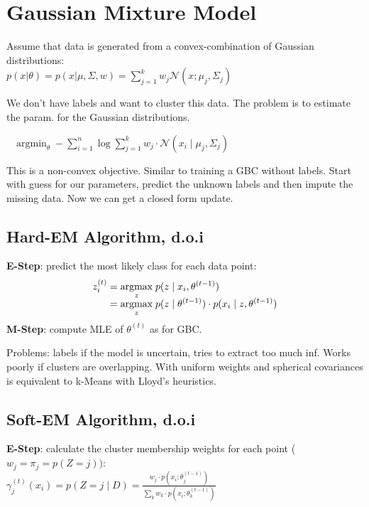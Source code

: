 \section*{Gaussian Mixture Model}

Assume that data is generated from a convex-combination of Gaussian distributions: \\[-8pt]

$p(x  | \theta) = p(x  | \mu, \Sigma, w) = \sum_{j=1}^k w_j \mathcal{N}(x; \mu_j, \Sigma_j)$

We don't have labels and want to cluster this data. The problem is to estimate the param. for the Gaussian distributions.

\ \ $\text{argmin}_{\theta} \; - \sum_{i=1}^n \log \sum_{j=1}^k w_j \cdot \mathcal{N}(x_i \; | \; \mu_j, \Sigma_j)$

This is a non-convex objective. Similar to training a GBC without labels. Start with guess for our parameters, predict the unknown labels and then impute the missing data. Now we can get a closed form update.

\subsection*{Hard-EM Algorithm, d.o.i}

\textbf{E-Step}: predict the most likely class for each data point:
\begin{align*}
	z_i^{(t)} &= \underset{z}{\text{argmax}} \; p(z \; | \; x_i, \theta^{(t-1)}) \\[-5pt]
	&= \underset{z}{\text{argmax}} \; p(z \; | \; \theta^{(t-1)}) \cdot p(x_i \; | \; z, \theta^{(t-1)})
\end{align*}
\textbf{M-Step}: compute MLE of $\theta^{(t)}$ as for GBC. \smallskip

Problems: labels if the model is uncertain, tries to extract too much inf. Works poorly if clusters are overlapping. With uniform weights and spherical covariances is equivalent to k-Means with Lloyd's heuristics.

\subsection*{Soft-EM Algorithm, d.o.i}

\textbf{E-Step}: calculate the cluster membership weights for each point ($w_j = \pi_j = p(Z = j))$: \\[-8pt]

\quad $\gamma_j^{(t)}(x_i) = p(Z = j \; | \; D) =\frac{w_j \cdot p(x_i ; \theta_j^{(t-1)})}{\sum_k w_k \cdot p(x_i ; \theta_k^{(t-1)})}$
		
